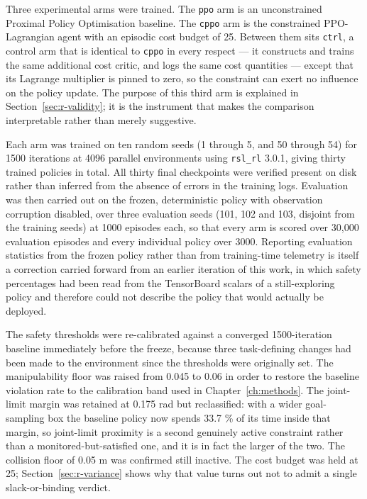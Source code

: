 Three experimental arms were trained. The \texttt{ppo} arm is an unconstrained Proximal Policy
Optimisation baseline. The \texttt{cppo} arm is the constrained PPO-Lagrangian agent  with an
episodic cost budget of 25. Between them sits \texttt{ctrl}, a control arm that is identical to \texttt{cppo} in
every respect --- it constructs and trains the same additional cost critic, and logs the same cost
quantities --- except that its Lagrange multiplier is pinned to zero, so the constraint can exert no
influence on the policy update. The purpose of this third arm is explained in Section~\ref{sec:r-validity}; it is
the instrument that makes the comparison interpretable rather than merely suggestive.

Each arm was trained on ten random seeds (1 through 5, and 50 through 54) for 1500 iterations at
4096 parallel environments using \texttt{rsl\_rl} 3.0.1, giving thirty trained policies in total. All
thirty final checkpoints were verified present on disk rather than inferred from the absence of
errors in the training logs. Evaluation was then carried out on the frozen, deterministic policy
with observation corruption disabled, over three evaluation seeds (101, 102 and 103, disjoint from
the training seeds) at 1000 episodes each, so that every arm is scored over 30,000 evaluation
episodes and every individual policy over 3000. Reporting evaluation statistics from the frozen
policy rather than from training-time telemetry is itself a correction carried forward from an
earlier iteration of this work, in which safety percentages had been read from the TensorBoard
scalars of a still-exploring policy and therefore could not describe the policy that would
actually be deployed.

The safety thresholds were re-calibrated against a converged 1500-iteration baseline immediately
before the freeze, because three task-defining changes had been made to the environment since the
thresholds were originally set. The manipulability floor was raised from 0.045 to 0.06 in order to
restore the baseline violation rate to the calibration band used in Chapter~\ref{ch:methods}. The joint-limit
margin was retained at 0.175 rad but reclassified: with a wider goal-sampling box the baseline
policy now spends 33.7 \% of its time inside that margin, so joint-limit proximity is a second
genuinely active constraint rather than a monitored-but-satisfied one, and it is in fact the
larger of the two. The collision floor of 0.05 m was confirmed still inactive. The cost budget was
held at 25; Section~\ref{sec:r-variance} shows why that value turns out not to admit a single slack-or-binding
verdict.

